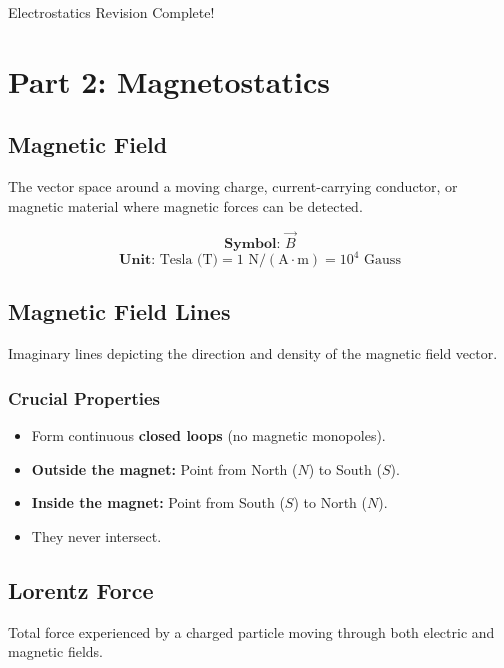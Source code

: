 \documentclass[11pt,a4paper]{article}
\begin{document}
\begin{successbox}
    Electrostatics Revision Complete! \checkmark
\end{successbox}

\newpage
\section{Part 2: Magnetostatics}

\subsection{Magnetic Field}
The vector space around a moving charge, current-carrying conductor, or magnetic material where magnetic forces can be detected.

\begin{formulabox}
    \[ \textbf{Symbol: } \vec{B} \]
    \[ \textbf{Unit: } \text{Tesla (T)} = 1\text{ N}/(\text{A}\cdot\text{m}) = 10^4 \text{ Gauss} \]
\end{formulabox}

\subsection{Magnetic Field Lines}
Imaginary lines depicting the direction and density of the magnetic field vector.
\subsubsection{Crucial Properties}
\begin{itemize}
    \item Form continuous \textbf{closed loops} (no magnetic monopoles).
    \item \textbf{Outside the magnet:} Point from North ($N$) to South ($S$).
    \item \textbf{Inside the magnet:} Point from South ($S$) to North ($N$).
    \item They never intersect.
\end{itemize}

\subsection{Lorentz Force}
\begin{pyqbox}
    Total force experienced by a charged particle moving through both electric and magnetic fields.
\end{pyqbox}
\end{document}
